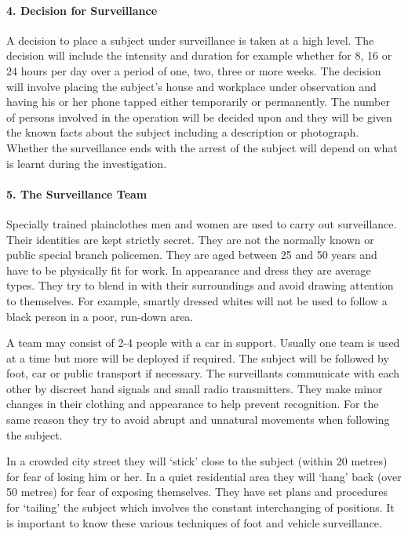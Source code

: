 \paragraph{4. Decision for Surveillance}

A decision to place a subject under surveillance is taken at a high
level. The decision will include the intensity and duration for example
whether for 8, 16 or 24 hours per day over a period of one, two, three
or more weeks. The decision will involve placing the subject's house and
workplace under observation and having his or her phone tapped either
temporarily or permanently. The number of persons involved in the
operation will be decided upon and they will be given the known facts
about the subject including a description or photograph. Whether the
surveillance ends with the arrest of the subject will depend on what is
learnt during the investigation.

\paragraph{5. The Surveillance Team}

Specially trained plainclothes men and women are used to carry out
surveillance. Their identities are kept strictly secret. They are not
the normally known or public special branch policemen. They are aged
between 25 and 50 years and have to be physically fit for work. In
appearance and dress they are average types. They try to blend in with
their surroundings and avoid drawing attention to themselves. For
example, smartly dressed whites will not be used to follow a black
person in a poor, run-down area.

A team may consist of 2-4 people with a car in support. Usually one team
is used at a time but more will be deployed if required. The subject
will be followed by foot, car or public transport if necessary. The
surveillants communicate with each other by discreet hand signals and
small radio transmitters. They make minor changes in their clothing and
appearance to help prevent recognition. For the same reason they try to
avoid abrupt and unnatural movements when following the subject.

In a crowded city street they will `stick' close to the subject (within
20 metres) for fear of losing him or her. In a quiet residential area
they will `hang' back (over 50 metres) for fear of exposing themselves.
They have set plans and procedures for `tailing' the subject which
involves the constant interchanging of positions. It is important to
know these various techniques of foot and vehicle surveillance.

